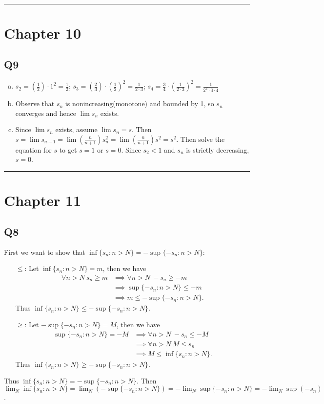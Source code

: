 \documentclass[12pt, lettersize]{article}
\newcommand{\lline}{\noindent\rule{\textwidth}{1pt}}
\begin{document}
	\lline
	\section*{Chapter 10}
	
	\subsection*{Q9}
	\begin{enumerate}[(a)]
		\item $s_2 = (\frac{1}{2})\cdot1^2=\frac{1}{2}$; $s_3=(\frac{2}{3})\cdot(\frac{1}{2})^2=\frac{1}{2\cdot3}$; $s_4=\frac{3}{4}\cdot(\frac{1}{2\cdot3})^2=\frac{1}{2^2\cdot3\cdot4}$
		\item Observe that $s_n$ is nonincreasing(monotone) and bounded by 1, so $s_n$ converges and hence $\lim s_n$ exists.
		\item Since $\lim s_n$ exists, assume $\lim s_n=s$. Then $s=\lim s_{n+1}=\lim(\frac{n}{n+1})s_n^2=\lim(\frac{n}{n+1})s^2=s^2$. Then solve the equation for $s$ to get $s=1$ or $s=0$. Since $s_2<1$ and $s_n$ is strictly decreasing, $s=0$.
	\end{enumerate}
	\lline
	
	\section*{Chapter 11}
	\subsection*{Q8}
	First we want to show that $\inf\{s_n: n>N\}=-\sup\{-s_n: n>N\}$:
	\begin{itemize}
		\item[$\leq$:] Let $\inf\{s_n: n>N\}=m$, then we have
		\begin{align*}
			\forall n>N\ s_n\geq m &\implies \forall n>N\ -s_n\geq -m\\
								   &\implies \sup\{-s_n: n>N\}\leq -m\\
								   &\implies m \leq -\sup\{-s_n: n>N\}.
		\end{align*}
		Thus $\inf\{s_n: n>N\}\leq-\sup\{-s_n: n>N\}$.
		\item[$\geq$:] Let $-\sup\{-s_n: n>N\}=M$, then we have
		\begin{align*}
			\sup\{-s_n: n>N\}=-M &\implies \forall n>N\ -s_n\leq -M\\
							   &\implies \forall n>N\ M\leq s_n\\
							   &\implies M\leq\inf\{s_n: n>N\}.
		\end{align*}
		Thus $\inf\{s_n: n>N\}\geq-\sup\{-s_n: n>N\}$.
	\end{itemize}
	Thus $\inf\{s_n: n>N\}=-\sup\{-s_n: n>N\}$. Then $\lim_N\inf\{s_n: n>N\}=\lim_N(-\sup\{-s_n: n>N\})=-\lim_N\sup\{-s_n: n>N\}=-\lim_N\sup(-s_n)$.
	
\end{document}
